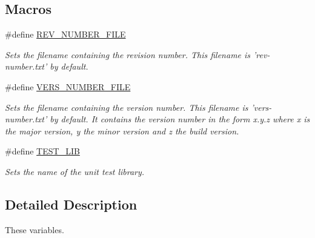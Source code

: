 \subsection*{Macros}
\begin{DoxyCompactItemize}
\item 
\hypertarget{group___private___variables_ga0a5bb7014615bdedc7fba9605063f8b6}{\#define \hyperlink{group___private___variables_ga0a5bb7014615bdedc7fba9605063f8b6}{R\+E\+V\+\_\+\+N\+U\+M\+B\+E\+R\+\_\+\+F\+I\+L\+E}}\label{group___private___variables_ga0a5bb7014615bdedc7fba9605063f8b6}

\begin{DoxyCompactList}\small\item\em Sets the filename containing the revision number. This filename is 'rev-\/number.\+txt' by default. \end{DoxyCompactList}\item 
\hypertarget{group___private___variables_ga1508c10238d0ce8ebee8aa038ee2869c}{\#define \hyperlink{group___private___variables_ga1508c10238d0ce8ebee8aa038ee2869c}{V\+E\+R\+S\+\_\+\+N\+U\+M\+B\+E\+R\+\_\+\+F\+I\+L\+E}}\label{group___private___variables_ga1508c10238d0ce8ebee8aa038ee2869c}

\begin{DoxyCompactList}\small\item\em Sets the filename containing the version number. This filename is 'vers-\/number.\+txt' by default. It contains the version number in the form x.\+y.\+z where x is the major version, y the minor version and z the build version. \end{DoxyCompactList}\item 
\hypertarget{group___private___variables_gae7e1dc72ef29963f4486a6efe6ad8e04}{\#define \hyperlink{group___private___variables_gae7e1dc72ef29963f4486a6efe6ad8e04}{T\+E\+S\+T\+\_\+\+L\+I\+B}}\label{group___private___variables_gae7e1dc72ef29963f4486a6efe6ad8e04}

\begin{DoxyCompactList}\small\item\em Sets the name of the unit test library. \end{DoxyCompactList}\end{DoxyCompactItemize}


\subsection{Detailed Description}
These variables. 

